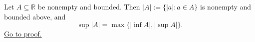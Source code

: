\begin{theorem}
\label{thm:supremum-absolute-value-image}
Let $A\subseteq\mathbb{R}$ be nonempty and bounded.  Then
$|A|:=\{|a|:a\in A\}$ is nonempty and bounded above, and
\[
  \sup |A|=\max\{|\inf A|,|\sup A|\}.
\]
\hyperref[prf:supremum-absolute-value-image]{Go to proof.}
\end{theorem}